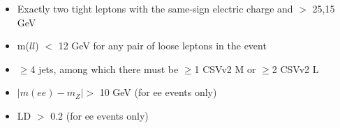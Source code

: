 \begin{itemize}
 \item Exactly two tight leptons with the same-sign electric charge and \pt $>$ 25,15 GeV
 \item m($ll$) $<$ 12 GeV for any pair of loose leptons in the event
 \item $\geq$4 jets, among which there must be $\geq$1 CSVv2 M or $\geq$2 CSVv2 L
 \item $|m(ee)-m_{Z}| >$ 10 GeV (for ee events only)
 \item \met LD $>$ 0.2 (for ee events only) 
\end{itemize}

